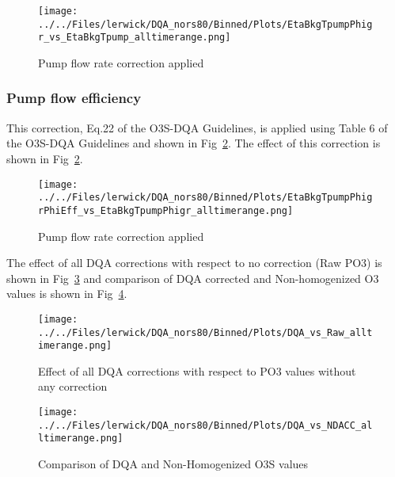 \documentclass{article}
\begin{document}
%
\begin{figure}
\centering
\texttt{[image: ../../Files/lerwick/DQA\_nors80/Binned/Plots/EtaBkgTpumpPhigr\_vs\_EtaBkgTpump\_alltimerange.png]}
\caption{Pump flow rate correction applied}
\label{fig:pf_ptu}
\end{figure}
\subsubsection{Pump flow efficiency}
This correction, Eq.22 of the O3S-DQA Guidelines, is applied using Table 6 of the O3S-DQA Guidelines and
shown in Fig~\ref{fig:pf_eff}.
The effect of this correction is shown in Fig~\ref{fig:pf_eff}.
%
\begin{figure}
\centering
\texttt{[image: ../../Files/lerwick/DQA\_nors80/Binned/Plots/EtaBkgTpumpPhigrPhiEff\_vs\_EtaBkgTpumpPhigr\_alltimerange.png]}
\caption{Pump flow rate correction applied}
\label{fig:pf_eff}
\end{figure}

%
The effect of all DQA corrections with respect to no correction (Raw PO3) is shown in Fig~\ref{fig:dqa_all}
and comparison of DQA corrected and
Non-homogenized O3 values is shown in Fig~\ref{fig:fig_dqa_ndacc}.

\begin{figure}
\centering
\texttt{[image: ../../Files/lerwick/DQA\_nors80/Binned/Plots/DQA\_vs\_Raw\_alltimerange.png]}
\caption{Effect of all DQA corrections with respect to PO3 values without any correction}
\label{fig:dqa_all}
\end{figure}
%
\begin{figure}
\centering
\texttt{[image: ../../Files/lerwick/DQA\_nors80/Binned/Plots/DQA\_vs\_NDACC\_alltimerange.png]}
\caption{Comparison of DQA and Non-Homogenized O3S values}
\label{fig:fig_dqa_ndacc}
\end{figure}
\end{document}
